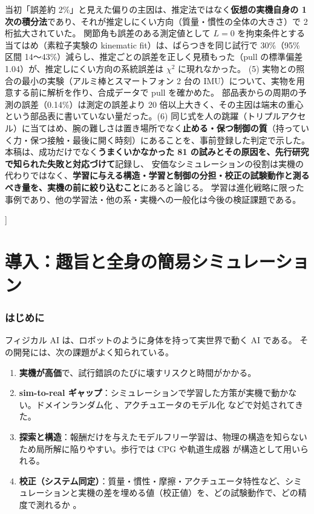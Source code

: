 \documentclass[paper=a4paper,fontsize=10pt,twocolumn,column_gap=2zw,line_length=24zw,number_of_lines=46,head_space=20mm]{jlreq}
\begin{document}
\begin{@twocolumnfalse}
\begin{center}
\begin{minipage}{0.9\textwidth}
当初「誤差約 2\%」と見えた偏りの主因は、推定法ではなく\textbf{仮想の実機自身の 1 次の積分法}であり、それが推定しにくい方向（質量・慣性の全体の大きさ）で 2 桁拡大されていた。
関節角も誤差のある測定値として $L=0$ を拘束条件とする当てはめ（素粒子実験の kinematic fit）は、ばらつきを同じ試行で 30\%（95\% 区間 14〜43\%）減らし、推定ごとの誤差を正しく見積もった（pull の標準偏差 1.04）が、推定しにくい方向の系統誤差は $\chi^2$ に現れなかった。
(5) 実物との照合の最小の実験（アルミ棒とスマートフォン 2 台の IMU）について、実物を用意する前に解析を作り、合成データで pull を確かめた。
部品表からの周期の予測の誤差（0.14\%）は測定の誤差より 20 倍以上大きく、その主因は端末の重心という部品表に書いていない量だった。(6) 同じ式を人の跳躍（トリプルアクセル）に当てはめ、腕の難しさは置き場所でなく\textbf{止める・保つ制御の質}（持っていく力・保つ接触・最後に開く時刻）にあることを、事前登録した判定で示した。
本稿は、成功だけでなく\textbf{うまくいかなかった 81 の試みとその原因を、先行研究で知られた失敗と対応づけて}記録し、
安価なシミュレーションの役割は実機の代わりではなく、\textbf{学習に与える構造・学習と制御の分担・校正の試験動作と測るべき量を、実機の前に絞り込むこと}にあると論じる。
学習は進化戦略に限った事例であり、他の学習法・他の系・実機への一般化は今後の検証課題である。
\end{minipage}\end{center}
\vspace{1em}
\end{@twocolumnfalse}
]

\part{導入：趣旨と全身の簡易シミュレーション}

\section{はじめに}\label{sec:intro}

フィジカル AI は、ロボットのように身体を持って実世界で動く AI である。
その開発には、次の課題がよく知られている。
\begin{enumerate}\setlength{\itemsep}{0pt}
\item \textbf{実機が高価}で、試行錯誤のたびに壊すリスクと時間がかかる。
\item \textbf{sim-to-real ギャップ}：シミュレーションで学習した方策が実機で動かない。ドメインランダム化 \cite{tobin2017,peng2018}、アクチュエータのモデル化 \cite{hwangbo2019} などで対処されてきた。
\item \textbf{探索と構造}：報酬だけを与えたモデルフリー学習は、物理の構造を知らないため局所解に陥りやすい。歩行では CPG \cite{ijspeert2008} や軌道生成器 \cite{iscen2018} が構造として用いられる。
\item \textbf{校正（システム同定）}：質量・慣性・摩擦・アクチュエータ特性など、シミュレーションと実機の差を埋める値（校正値）を、どの試験動作で、どの精度で測れるか \cite{atkeson1986,gautier1990}。
\end{enumerate}
\end{document}
